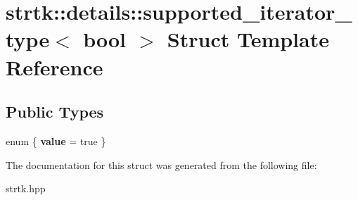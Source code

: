 \hypertarget{structstrtk_1_1details_1_1supported__iterator__type_3_01bool_01_4}{\section{strtk\-:\-:details\-:\-:supported\-\_\-iterator\-\_\-type$<$ bool $>$ Struct Template Reference}
\label{structstrtk_1_1details_1_1supported__iterator__type_3_01bool_01_4}
}
\subsection*{Public Types}
\begin{DoxyCompactItemize}
\item 
enum \{ {\bfseries value} = true
 \}
\end{DoxyCompactItemize}


The documentation for this struct was generated from the following file\-:\begin{DoxyCompactItemize}
\item 
strtk.\-hpp\end{DoxyCompactItemize}
